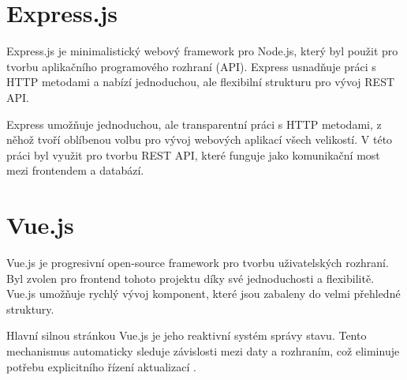 \section{Express.js}
Express.js je minimalistický webový framework pro Node.js, který byl použit pro tvorbu aplikačního programového rozhraní (API). Express usnadňuje práci s HTTP metodami a nabízí jednoduchou, ale flexibilní strukturu pro vývoj REST API\cite{expressjsExpressNodejs}.

Express umožňuje jednoduchou, ale transparentní práci s HTTP metodami, z něhož tvoří oblíbenou volbu pro vývoj webových aplikací všech velikostí. V této práci byl využit pro tvorbu REST API, které funguje jako komunikační most mezi frontendem a databází.

\section{Vue.js}
Vue.js je progresivní open-source framework pro tvorbu uživatelských rozhraní\cite{vuejsVuejs}. Byl zvolen pro frontend tohoto projektu díky své jednoduchosti a flexibilitě. Vue.js umožňuje rychlý vývoj komponent, které jsou zabaleny do velmi přehledné struktury.

Hlavní silnou stránkou Vue.js je jeho reaktivní systém správy stavu. Tento mechanismus automaticky sleduje závislosti mezi daty a rozhraním, což eliminuje potřebu explicitního řízení aktualizací \cite{vuejsVuejsDocs}.

